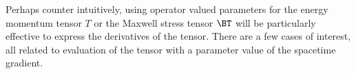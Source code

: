 Perhaps counter intuitively, using operator valued parameters for the energy momentum tensor \( T \) or the Maxwell stress tensor \( \BT \) will be particularly effective to express the derivatives of the tensor.  There are a few cases of interest, all related to evaluation of the tensor with a parameter value of the spacetime gradient.
\index{\(\BT(\spacegrad)\)}
